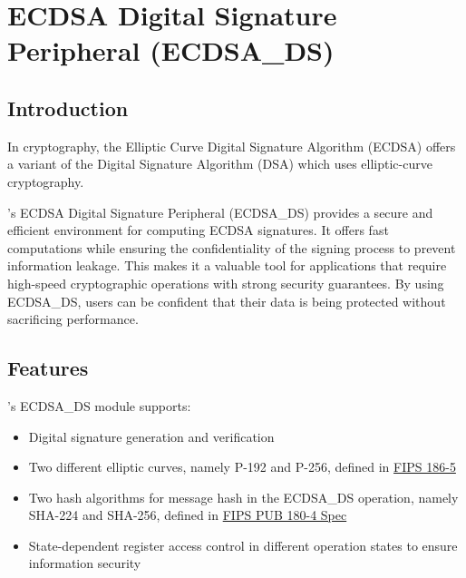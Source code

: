 \documentclass[main\_\_EN.tex]{subfiles}
\begin{document}

\ifglobal
\else
    {\let\clearpage\relax \listoftodos}
    {\let\clearpage\relax \listofdonetodos}
    \tableofcontents
\fi











\hypertarget{ecdsa}{}
\chapter{ECDSA Digital Signature Peripheral (ECDSA\_DS)}
\label{mod:ecdsa}



\section{Introduction}

In cryptography, the Elliptic Curve Digital Signature Algorithm (ECDSA) offers a variant of the Digital Signature Algorithm (DSA) which uses elliptic-curve cryptography.

\chipname{}'s ECDSA Digital Signature Peripheral (ECDSA\_DS) provides a secure and efficient environment for computing ECDSA signatures. It offers fast computations while ensuring the confidentiality of the signing process to prevent information leakage. This makes it a valuable tool for applications that require high-speed cryptographic operations with strong security guarantees. By using ECDSA\_DS, users can be confident that their data is being protected without sacrificing performance.


\section{Features}
\label{sec:ecdsa-features}

\chipname{}'s ECDSA\_DS module supports:

\begin{itemize}
    \item Digital signature generation and verification
    \item Two different elliptic curves, namely P-192 and P-256, defined in \href{https://nvlpubs.nist.gov/nistpubs/FIPS/NIST.FIPS.186-5.pdf}{FIPS 186-5}
    \item Two hash algorithms for message hash in the ECDSA\_DS operation, namely SHA-224 and SHA-256, defined in \href{https://doi.org/10.6028/NIST.FIPS.180-4}{FIPS PUB 180-4 Spec}
    \item State-dependent register access control in different operation states to ensure information security
\end{itemize}
\end{document}
